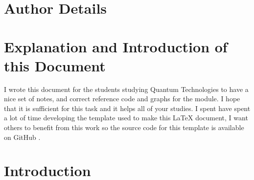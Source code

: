 \documentclass[colorlinks,11pt,a4paper,normalphoto,withhyper,ragged2e]{altareport}
\begin{document}
\MakeReportTitlePage


\setcounter{page}{1}





\section*{Author Details}
\makeauthordetails

\setcounter{tocdepth}{2} 
\tableofcontents %





\section*{Explanation and Introduction of this Document}
I wrote this document for the students studying Quantum Technologies to have a nice set of notes, and correct reference code and graphs for the module. I hope that it is sufficient for this task and it helps all of your studies. \linebreak
I spent have spent a lot of time developing the template used to make this {\LaTeX} document, I want others to benefit from this work so the source code for this template is available on GitHub \cite{latex_template_github}.
\newpage
{} %




\section{Introduction}
	
\end{document}
